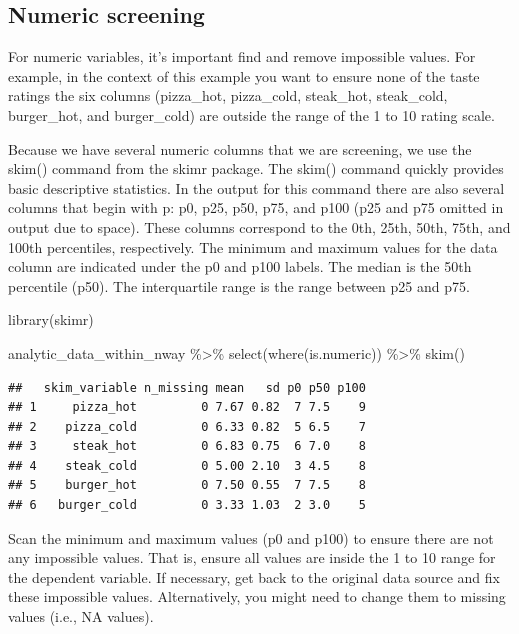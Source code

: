 \documentclass[
]{krantz}
\makeatletter
\newenvironment{Shaded}{\begin{snugshade}}{\end{snugshade}}
\newcommand{\FunctionTok}[1]{\textcolor[rgb]{0,0,0}{#1}}
\newcommand{\NormalTok}[1]{#1}
\newcommand{\SpecialCharTok}[1]{\textcolor[rgb]{0,0,0}{#1}}
\newenvironment{kframe}{%
\medskip{}
\setlength{\fboxsep}{.8em}
 \def\at@end@of@kframe{}%
 \ifinner\ifhmode%
  \def\at@end@of@kframe{\end{minipage}}%
  \begin{minipage}{\columnwidth}%
 \fi\fi%
 \def\FrameCommand##1{\hskip\@totalleftmargin \hskip-\fboxsep
 \colorbox{shadecolor}{##1}\hskip-\fboxsep
     \hskip-\linewidth \hskip-\@totalleftmargin \hskip\columnwidth}%
 \MakeFramed {\advance\hsize-\width
   \@totalleftmargin\z@ \linewidth\hsize
   \@setminipage}}%
 {\par\unskip\endMakeFramed%
 \at@end@of@kframe}
\renewenvironment{Shaded}{\begin{kframe}}{\end{kframe}}
\makeatother
\begin{document}
\hypertarget{numeric-screening-2}{%
\subsection{Numeric screening}\label{numeric-screening-2}}

For numeric variables, it's important find and remove impossible values. For example, in the context of this example you want to ensure none of the taste ratings the six columns (pizza\_hot, pizza\_cold, steak\_hot, steak\_cold, burger\_hot, and burger\_cold) are outside the range of the 1 to 10 rating scale.

Because we have several numeric columns that we are screening, we use the skim() command from the skimr package. The skim() command quickly provides basic descriptive statistics. In the output for this command there are also several columns that begin with p: p0, p25, p50, p75, and p100 (p25 and p75 omitted in output due to space). These columns correspond to the 0th, 25th, 50th, 75th, and 100th percentiles, respectively. The minimum and maximum values for the data column are indicated under the p0 and p100 labels. The median is the 50th percentile (p50). The interquartile range is the range between p25 and p75.

\begin{Shaded}
\begin{Highlighting}[]
\FunctionTok{library}\NormalTok{(skimr)}

\NormalTok{analytic\_data\_within\_nway }\SpecialCharTok{\%\textgreater{}\%}
  \FunctionTok{select}\NormalTok{(}\FunctionTok{where}\NormalTok{(is.numeric)) }\SpecialCharTok{\%\textgreater{}\%}
  \FunctionTok{skim}\NormalTok{()}
\end{Highlighting}
\end{Shaded}

\begin{verbatim}
##   skim_variable n_missing mean   sd p0 p50 p100
## 1     pizza_hot         0 7.67 0.82  7 7.5    9
## 2    pizza_cold         0 6.33 0.82  5 6.5    7
## 3     steak_hot         0 6.83 0.75  6 7.0    8
## 4    steak_cold         0 5.00 2.10  3 4.5    8
## 5    burger_hot         0 7.50 0.55  7 7.5    8
## 6   burger_cold         0 3.33 1.03  2 3.0    5
\end{verbatim}

Scan the minimum and maximum values (p0 and p100) to ensure there are not any impossible values. That is, ensure all values are inside the 1 to 10 range for the dependent variable. If necessary, get back to the original data source and fix these impossible values. Alternatively, you might need to change them to missing values (i.e., NA values).
\end{document}
